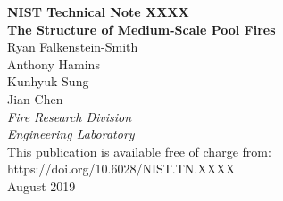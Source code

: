 \documentclass[12pt]{article}
\newcommand{\pubnumber}{XXXX}
\newcommand{\DOI}{https://doi.org/10.6028/NIST.TN.XXXX}
\newcommand{\monthyear}{August 2019}
\begin{document}
\begin{titlepage}
\begin{flushright}
\LARGE{\textbf{NIST Technical Note \pubnumber}}\\
\vfill
\Huge{\textbf{The Structure of Medium-Scale Pool Fires}}\\
\vfill
\normalsize Ryan Falkenstein-Smith\\
Anthony Hamins\\
Kunhyuk Sung\\
Jian Chen\\
\large
\textit{Fire Research Division}\\
\textit{Engineering Laboratory}\\
\vspace{12pt}
\vfill
\normalsize This publication is available free of charge from:\\
\DOI\\
\vfill
\normalsize \monthyear
\vfill


\end{flushright}
\end{titlepage}
\end{document}
